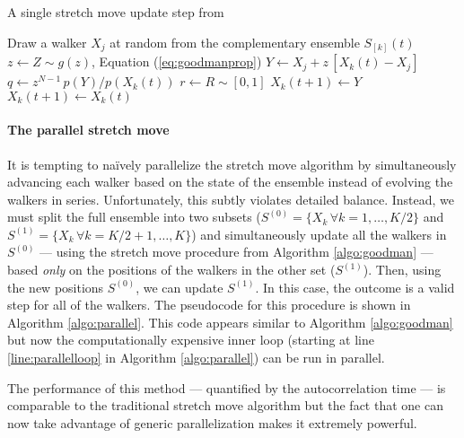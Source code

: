 \documentclass[12pt,preprint]{aastex}
\newcommand{\Eq}[1]{Equation (\ref{eq:#1})}
\newcommand{\eq}[1]{Equation (\ref{eq:#1})}
\newcommand{\algo}[1]{Algorithm \ref{algo:#1}}
\newcommand{\algolabel}[1]{\label{algo:#1}}
\newcommand{\ensemble}{S}
\newcommand{\colorens}[1]{\ensemble^{(#1)}}
\newcommand{\red}{\colorens{0}}
\newcommand{\blue}{\colorens{1}}
\renewcommand{\vector}[1]{#1}
\begin{document}
\begin{algorithm}
\caption{A single stretch move update step from 
    \algolabel{goodman}}
\begin{algorithmic}[1]
    \STATE Draw a walker $X_j$ at random from the complementary ensemble %
        $\ensemble_{[k]}(t)$
    \STATE $z \gets Z \sim g(z)$, \Eq{goodmanprop}
    \STATE $\vector{Y} \gets \vector{X_j} %
                + z \, [ \vector{X_k} (t) - \vector{X_j}]$
    \STATE $q \gets z^{N-1} \, p(Y)/p(X_k(t))$ \label{line:hard}%
        \hspace{1cm}{\footnotesize\it // This line is generally expensive}
    \STATE $r \gets R \sim [0, 1]$
    \IF{$r \ge q$, \eq{acceptance}}
        \STATE $X_k(t+1) \gets Y$
    \ELSE
        \STATE $X_k(t+1) \gets X_k(t)$
    \ENDIF
\ENDFOR
\end{algorithmic}
\end{algorithm}

\paragraph{The parallel stretch move}

It is tempting to na\"ively parallelize the stretch move algorithm by
simultaneously advancing each walker based on the state of the ensemble
instead of evolving the walkers in series. Unfortunately, this subtly
violates detailed balance. Instead, we must split the full ensemble
into two subsets
($\red = \{ \vector{X_k} \, \forall k = 1, \ldots, K/2 \}$ and
$\blue = \{ \vector{X_k} \, \forall k = K/2+1, \ldots, K \}$) and
simultaneously update all the walkers in $\red$
--- using the stretch move procedure from \algo{goodman} ---
based \emph{only} on the positions of the walkers in the other set
($\blue$). Then, using the new positions $\red$,
we can update $\blue$. In this case, the outcome is a valid step
for all of the walkers. The pseudocode for
this procedure is shown in \algo{parallel}. This code appears similar to
\algo{goodman} but now the computationally expensive inner loop
(starting at line \ref{line:parallelloop} in \algo{parallel}) can be run in
parallel.

The performance of this method --- quantified by the autocorrelation time ---
is comparable to the traditional stretch move algorithm but the fact that one
can now take advantage of generic parallelization makes it
extremely powerful.
\end{document}
